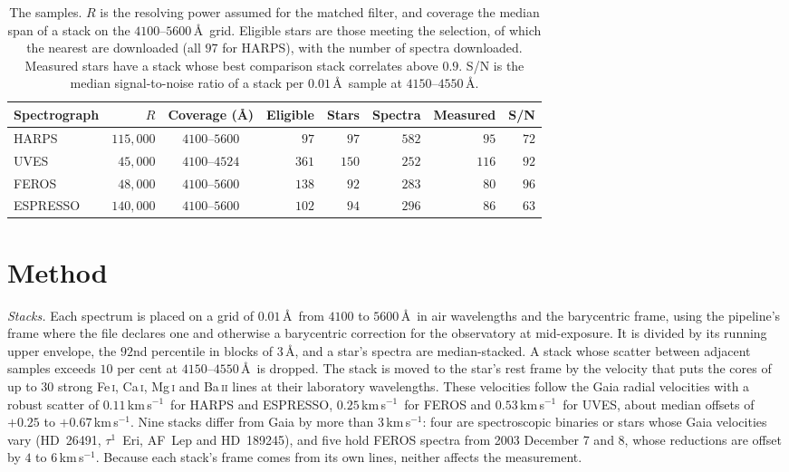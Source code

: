 \documentclass[3p,11pt]{elsarticle}
\newcommand{\kms}{km\,s$^{-1}$}
\newcommand{\ion}[2]{#1\,\textsc{#2}}
\begin{document}
\begin{table}[t]
\centering\small
\caption{The samples. $R$ is the resolving power assumed for the matched filter, and
coverage the median span of a stack on the $4100$--$5600$\,\AA\ grid. Eligible stars are
those meeting the selection, of which the nearest are downloaded (all $97$ for HARPS),
with the number of spectra downloaded. Measured stars have a stack whose
best comparison stack correlates above $0.9$. S/N is the median signal-to-noise ratio
of a stack per $0.01$\,\AA\ sample at $4150$--$4550$\,\AA.}
\label{tab:data}
\begin{tabular}{l r c r r r r r}
\toprule
Spectrograph & $R$ & Coverage (\AA) & Eligible & Stars & Spectra & Measured & S/N \\
\midrule
HARPS & $115{,}000$ & $4100$--$5600$ & $97$ & $97$ & $582$ & $95$ & $72$ \\
UVES & $45{,}000$ & $4100$--$4524$ & $361$ & $150$ & $252$ & $116$ & $92$ \\
FEROS & $48{,}000$ & $4100$--$5600$ & $138$ & $92$ & $283$ & $80$ & $96$ \\
ESPRESSO & $140{,}000$ & $4100$--$5600$ & $102$ & $94$ & $296$ & $86$ & $63$ \\
\bottomrule
\end{tabular}
\end{table}

\section{Method}\label{sec:method}

\emph{Stacks.} Each spectrum is placed on a grid of $0.01$\,\AA\ from $4100$ to
$5600$\,\AA\ in air wavelengths and the barycentric frame, using the pipeline's frame
where the file declares one and otherwise a barycentric correction for the observatory at
mid-exposure. It is divided by its running upper envelope, the $92$nd percentile in
blocks of $3$\,\AA, and a star's spectra are median-stacked. A stack whose scatter
between adjacent samples exceeds $10$ per cent at $4150$--$4550$\,\AA\ is dropped. The
stack is moved to the star's rest frame by the velocity that puts the cores of up to
$30$ strong \ion{Fe}{i}, \ion{Ca}{i}, \ion{Mg}{i} and \ion{Ba}{ii} lines at their
laboratory wavelengths. These velocities follow the Gaia radial velocities with a robust
scatter of $0.11$\,\kms\ for HARPS and ESPRESSO, $0.25$\,\kms\ for FEROS and
$0.53$\,\kms\ for UVES, about median offsets of $+0.25$ to $+0.67$\,\kms. Nine stacks
differ from Gaia by more than $3$\,\kms: four are spectroscopic binaries or stars whose
Gaia velocities vary (HD~26491, $\tau^1$~Eri, AF~Lep and HD~189245), and five hold FEROS
spectra from 2003 December 7 and 8, whose reductions are offset by $4$ to $6$\,\kms.
Because each stack's frame comes from its own lines, neither affects the measurement.
\end{document}
